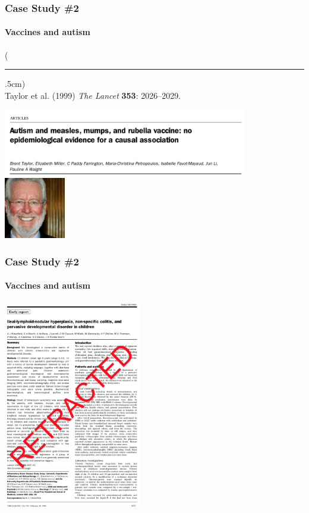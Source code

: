 \documentclass[10pt]{beamer}
\newenvironment{reference}[2]{%
	\begin{textblock*}{\textwidth}(#1,#2)
		\tiny\bgroup\color{gray}}{\egroup\end{textblock*}}
\begin{document}
\begin{frame}
\frametitle{Case Study \#2}
\framesubtitle{Vaccines and autism}

	\begin{reference}{4mm}{92mm}
		\rule{1.5cm}{0.25pt}\\
		Taylor et al. (1999) \emph{The Lancet} \textbf{353}: 2026--2029.
	\end{reference}

	\begin{center}
		\includegraphics[width=0.8\textwidth]{figures/taylor_paper.png}\\
		\vspace{0.5cm}
		\includegraphics[width=0.2\textwidth]{figures/taylor.jpeg}
	\end{center}
\end{frame}


\begin{frame}
\frametitle{Case Study \#2}
\framesubtitle{Vaccines and autism}

	\begin{center}
		\includegraphics[width=0.45\textwidth]{figures/wakefield_paper3.png}
	\end{center}
\end{frame}

	
\end{document}
